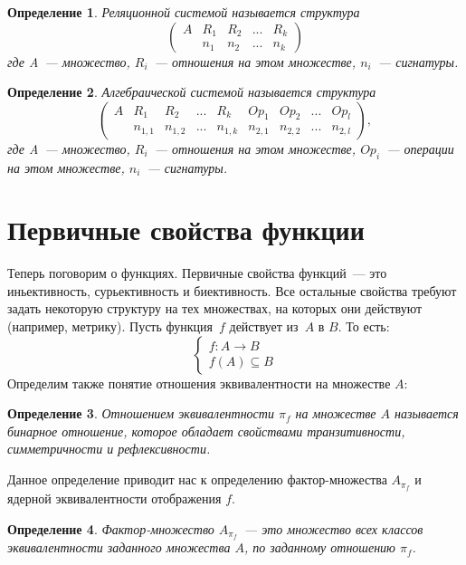 \documentclass[a4paper, 12pt]{report}
\newtheorem{definition}{Определение}[chapter]
\begin{document}
\begin{definition}
Реляционной системой называется структура
\[
\left(
\begin{array}{ccccc}
  A & R_1 & R_2 & ... & R_k \\
    & n_1 & n_2 & ... & n_k
\end{array}
\right)
\]
где A~--- множество, $R_i$~--- отношения на этом множестве, $n_i$~--- сигнатуры.
\end{definition}

\begin{definition}
Алгебраической системой называется структура
\[
\left(
\begin{array}{ccccccccc}
  A & R_1 & R_2 & ... & R_k & Op_1 & Op_2 & ... & Op_l \\
    & n_{1,1} & n_{1,2} & ... & n_{1,k} & n_{2,1} & n_{2,2} & ... & n_{2,l}
\end{array}
\right),
\]
где A~--- множество, $R_i$~--- отношения на этом множестве, $Op_i$~--- операции на этом множестве, $n_i$~--- сигнатуры.
\end{definition}

\section{Первичные свойства функции}
Теперь поговорим о функциях. Первичные свойства функций~--- это иньективность, сурьективность и биективность. Все остальные свойства требуют задать некоторую структуру на тех множествах, на которых они действуют (например, метрику).
Пусть функция~$f$ действует из~$A$ в $B$. То есть:
\[
\left\{
  \begin{array}{ll}
    f: A\rightarrow B\\
    f(A) \subseteq B
  \end{array}
\right.
\]
Определим также понятие отношения эквивалентности на множестве $A$:

\begin{definition}
Отношением эквивалентности $\pi_f$ на множестве $A$ называется бинарное отношение, которое обладает свойствами транзитивности, симметричности и рефлексивности.
\end{definition}

Данное определение приводит нас к определению фактор-множества $A_{\pi_f}$ и ядерной эквивалентности отображения $f$.

\begin{definition}
Фактор-множество $A_{\pi_f}$~--- это множество всех классов эквивалентности заданного множества $A$, по заданному отношению $\pi_f$.
\end{definition}
\end{document}
